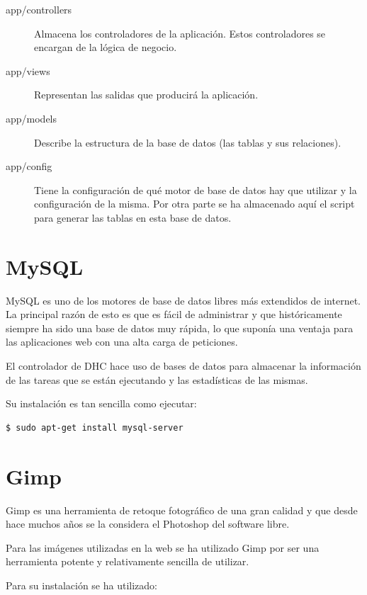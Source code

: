 \begin{description}
	\item[app/controllers] Almacena los controladores de la aplicación. Estos controladores se encargan de la lógica de negocio.
	
	\item[app/views] Representan las salidas que producirá la aplicación.
	
	\item[app/models] Describe la estructura de la base de datos (las tablas y sus relaciones).

	\item[app/config] Tiene la configuración de qué motor de base de datos hay que utilizar y la configuración de la misma. Por otra parte se ha almacenado aquí el script para generar las tablas en esta base de datos.
\end{description}

\section{MySQL}

MySQL es uno de los motores de base de datos libres más extendidos de internet. La principal razón de esto es que es fácil de administrar y que históricamente siempre ha sido una base de datos muy rápida, lo que suponía una ventaja para las aplicaciones web con una alta carga de peticiones.

El controlador de DHC hace uso de bases de datos para almacenar la información de las tareas que se están ejecutando y las estadísticas de las mismas.

Su instalación es tan sencilla como ejecutar:

\begin{verbatim}
$ sudo apt-get install mysql-server
\end{verbatim}

\section{Gimp}

Gimp es una herramienta de retoque fotográfico de una gran calidad y que desde hace muchos años se la considera el Photoshop del software libre.

Para las imágenes utilizadas en la web se ha utilizado Gimp por ser una herramienta potente y relativamente sencilla de utilizar.

Para su instalación se ha utilizado:

